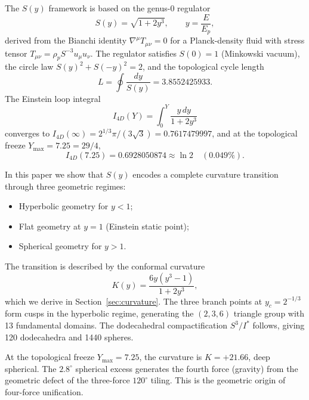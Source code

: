 \documentclass[12pt,oneside,openany]{book}
\begin{document}
The \(S(y)\) framework is based on the genus-\(0\) regulator
\begin{equation}
S(y) = \sqrt{1 + 2y^3}, \qquad y = \frac{E}{E_p},
\label{eq:S}
\end{equation}
derived from the Bianchi identity \(\nabla^\mu T_{\mu\nu} = 0\) for a Planck-density fluid with stress tensor \(T_{\mu\nu} = \rho_p S^{-3}u_\mu u_\nu\). The regulator satisfies \(S(0) = 1\) (Minkowski vacuum), the circle law \(S(y)^2 + S(-y)^2 = 2\), and the topological cycle length
\begin{equation}
L = \oint \frac{dy}{S(y)} = 3.8552425933.
\end{equation}
The Einstein loop integral
\begin{equation}
I_{4D}(Y) = \int_0^Y \frac{y\,dy}{1+2y^3}
\end{equation}
converges to \(I_{4D}(\infty) = 2^{1/3}\pi/(3\sqrt{3}) = 0.7617479997\), and at the topological freeze \(Y_{\max} = 7.25 = 29/4\),
\begin{equation}
I_{4D}(7.25) = 0.6928050874 \approx \ln 2 \quad (0.049\%).
\end{equation}

In this paper we show that \(S(y)\) encodes a complete curvature transition through three geometric regimes:
\begin{itemize}
\item Hyperbolic geometry for \(y < 1\);
\item Flat geometry at \(y = 1\) (Einstein static point);
\item Spherical geometry for \(y > 1\).
\end{itemize}
The transition is described by the conformal curvature
\begin{equation}
K(y) = \frac{6y(y^3-1)}{1+2y^3},
\label{eq:K}
\end{equation}
which we derive in Section~\ref{sec:curvature}. The three branch points at \(y_c = 2^{-1/3}\) form cusps in the hyperbolic regime, generating the \((2,3,6)\) triangle group with 13 fundamental domains. The dodecahedral compactification \(S^3/I^*\) follows, giving 120 dodecahedra and 1440 spheres.

At the topological freeze \(Y_{\max} = 7.25\), the curvature is \(K = +21.66\), deep spherical. The \(2.8^\circ\) spherical excess generates the fourth force (gravity) from the geometric defect of the three-force \(120^\circ\) tiling. This is the geometric origin of four-force unification.

\end{document}
